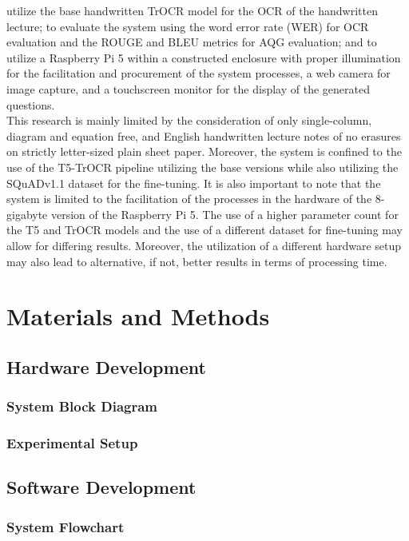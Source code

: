 \documentclass[conference]{IEEEtran}
\begin{document}
utilize the base handwritten TrOCR model for the OCR of the handwritten lecture;
to evaluate the system using the word error rate (WER) for OCR evaluation and
the ROUGE and BLEU metrics for AQG evaluation; and to utilize a Raspberry Pi 5
within a constructed enclosure with proper illumination for the 
facilitation and procurement of the system processes, a web camera for image
capture, and a touchscreen monitor for the display of the generated questions.
\\ 
\indent This research is mainly limited by the consideration of only 
single-column, diagram and equation free, and English handwritten lecture notes 
of no erasures on strictly letter-sized plain sheet paper.
Moreover, the system is confined to the 
use of the T5-TrOCR pipeline utilizing the base versions while 
also utilizing the SQuADv1.1 dataset for the fine-tuning. It is also important 
to note that the system is limited to the facilitation of the processes in 
the hardware of the 8-gigabyte version of the Raspberry Pi 5. The use of 
a higher parameter count for the T5 and TrOCR models and the use of a different 
dataset for fine-tuning may allow for differing results. Moreover, the 
utilization of a different hardware setup may also lead to alternative, if not, 
better results in terms of processing time. 



\section{Materials and Methods}
    \subsection{Hardware Development}
        \subsubsection{System Block Diagram}
        \subsubsection{Experimental Setup}
    \subsection{Software Development}
        \subsubsection{System Flowchart}
\end{document}
